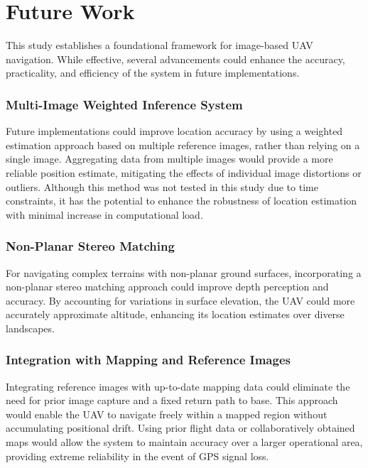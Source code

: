 

\chapter{Future Work}

This study establishes a foundational framework for image-based UAV navigation. While effective, several advancements could enhance the accuracy, practicality, and efficiency of the system in future implementations.

\subsection{Multi-Image Weighted Inference System}

Future implementations could improve location accuracy by using a weighted estimation approach based on multiple reference images, rather than relying on a single image. Aggregating data from multiple images would provide a more reliable position estimate, mitigating the effects of individual image distortions or outliers. Although this method was not tested in this study due to time constraints, it has the potential to enhance the robustness of location estimation with minimal increase in computational load.

\subsection{Non-Planar Stereo Matching}

For navigating complex terrains with non-planar ground surfaces, incorporating a non-planar stereo matching approach could improve depth perception and accuracy. By accounting for variations in surface elevation, the UAV could more accurately approximate altitude, enhancing its location estimates over diverse landscapes.

\subsection{Integration with Mapping and Reference Images}

Integrating reference images with up-to-date mapping data could eliminate the need for prior image capture and a fixed return path to base. This approach would enable the UAV to navigate freely within a mapped region without accumulating positional drift. Using prior flight data or collaboratively obtained maps would allow the system to maintain accuracy over a larger operational area, providing extreme reliability in the event of GPS signal loss.

